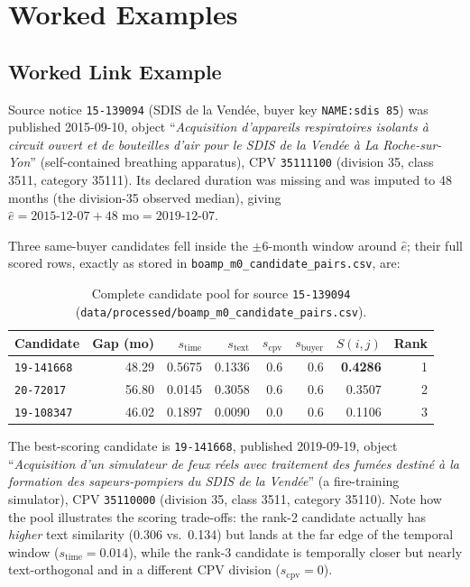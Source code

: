 \documentclass[11pt]{article}
\begin{document}
\section{Worked Examples}
\label{sec:worked}

\subsection{Worked Link Example}
Source notice \texttt{15-139094} (SDIS de la Vend\'ee, buyer key
\texttt{NAME:sdis 85}) was published 2015-09-10, object ``\emph{Acquisition
d'appareils respiratoires isolants \`a circuit ouvert et de bouteilles
d'air pour le SDIS de la Vend\'ee \`a La Roche-sur-Yon}'' (self-contained
breathing apparatus), CPV \texttt{35111100} (division 35, class 3511,
category 35111). Its declared duration was missing and was imputed to 48
months (the division-35 observed median), giving
$\hat e = 2015\text{-}12\text{-}07 + 48\text{ mo} = 2019\text{-}12\text{-}07$.

Three same-buyer candidates fell inside the $\pm 6$-month window around
$\hat e$; their full scored rows, exactly as stored in
\texttt{boamp\_m0\_candidate\_pairs.csv}, are:

\begin{table}[h!]
\centering
\caption{Complete candidate pool for source \texttt{15-139094}
(\texttt{data/processed/boamp\_m0\_candidate\_pairs.csv}).}
\small
\begin{tabular}{lrrrrrrr}
\toprule
Candidate & Gap (mo) & $s_{\text{time}}$ & $s_{\text{text}}$ & $s_{\text{cpv}}$ & $s_{\text{buyer}}$ & $S(i,j)$ & Rank \\
\midrule
\texttt{19-141668} & 48.29 & 0.5675 & 0.1336 & 0.6 & 0.6 & \textbf{0.4286} & 1 \\
\texttt{20-72017} & 56.80 & 0.0145 & 0.3058 & 0.6 & 0.6 & 0.3507 & 2 \\
\texttt{19-108347} & 46.02 & 0.1897 & 0.0090 & 0.0 & 0.6 & 0.1106 & 3 \\
\bottomrule
\end{tabular}
\end{table}

The best-scoring candidate is \texttt{19-141668}, published
2019-09-19, object ``\emph{Acquisition d'un simulateur de feux r\'eels avec
traitement des fum\'ees destin\'e \`a la formation des sapeurs-pompiers du
SDIS de la Vend\'ee}'' (a fire-training simulator), CPV \texttt{35110000}
(division 35, class 3511, category 35110). Note how the pool illustrates
the scoring trade-offs: the rank-2 candidate actually has \emph{higher}
text similarity (0.306 vs.\ 0.134) but lands at the far edge of the
temporal window ($s_{\text{time}}=0.014$), while the rank-3 candidate is
temporally closer but nearly text-orthogonal and in a different CPV
division ($s_{\text{cpv}}=0$).
\end{document}
